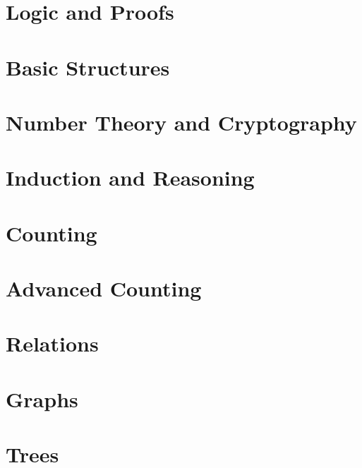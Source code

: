 \documentclass{package/notes}
\begin{document}
\chapter{Logic and Proofs}



\chapter{Basic Structures}



\chapter{Number Theory and Cryptography}



\chapter{Induction and Reasoning}



\chapter{Counting}


\chapter{Advanced Counting}



\chapter{Relations}


\chapter{Graphs}



\chapter{Trees}
\end{document}
